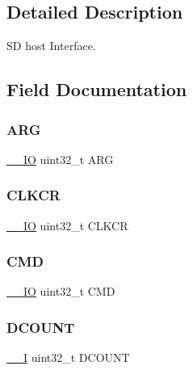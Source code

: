 \subsection{Detailed Description}
SD host Interface. 

\subsection{Field Documentation}
\mbox{\label{struct_s_d_i_o___type_def_a07d4e63efcbde252c667e64a8d818aa9}} 
\subsubsection{\texorpdfstring{ARG}{ARG}}
{\footnotesize\ttfamily \mbox{\hyperlink{core__sc300_8h_aec43007d9998a0a0e01faede4133d6be}{\+\_\+\+\_\+\+IO}} uint32\+\_\+t A\+RG}

\mbox{\label{struct_s_d_i_o___type_def_aa94197378e20fc739d269be49d9c5d40}} 
\subsubsection{\texorpdfstring{CLKCR}{CLKCR}}
{\footnotesize\ttfamily \mbox{\hyperlink{core__sc300_8h_aec43007d9998a0a0e01faede4133d6be}{\+\_\+\+\_\+\+IO}} uint32\+\_\+t C\+L\+K\+CR}

\mbox{\label{struct_s_d_i_o___type_def_adcf812cbe5147d300507d59d4a55935d}} 
\subsubsection{\texorpdfstring{CMD}{CMD}}
{\footnotesize\ttfamily \mbox{\hyperlink{core__sc300_8h_aec43007d9998a0a0e01faede4133d6be}{\+\_\+\+\_\+\+IO}} uint32\+\_\+t C\+MD}

\mbox{\label{struct_s_d_i_o___type_def_a4273e2b5aeb7bdf1006909b1a2b59bc8}} 
\subsubsection{\texorpdfstring{DCOUNT}{DCOUNT}}
{\footnotesize\ttfamily \mbox{\hyperlink{core__sc300_8h_af63697ed9952cc71e1225efe205f6cd3}{\+\_\+\+\_\+I}} uint32\+\_\+t D\+C\+O\+U\+NT}

